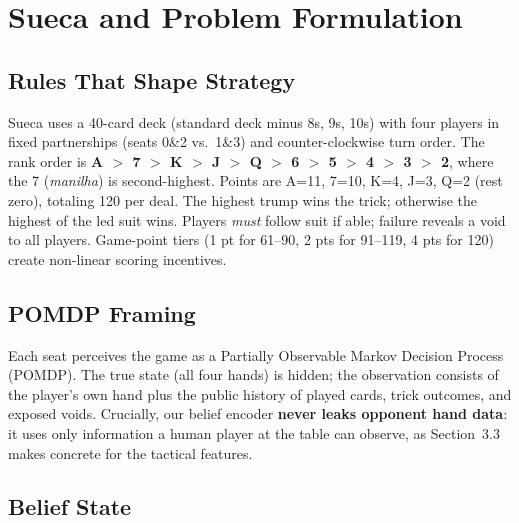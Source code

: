 \documentclass[runningheads]{llncs}
\begin{document}
\section{Sueca and Problem Formulation}

\subsection{Rules That Shape Strategy}

Sueca uses a 40-card deck (standard deck minus 8s, 9s, 10s) with four players
in fixed partnerships (seats 0\&2 vs.\ 1\&3) and counter-clockwise turn order.
The rank order is \textbf{A $>$ 7 $>$ K $>$ J $>$ Q $>$ 6 $>$ 5 $>$ 4 $>$ 3 $>$
2}, where the 7 (\emph{manilha}) is second-highest. Points are A=11, 7=10,
K=4, J=3, Q=2 (rest zero), totaling 120 per deal. The highest trump wins the
trick; otherwise the highest of the led suit wins. Players \emph{must} follow
suit if able; failure reveals a void to all players. Game-point tiers (1 pt for
61--90, 2 pts for 91--119, 4 pts for 120) create non-linear scoring incentives.

\subsection{POMDP Framing}

Each seat perceives the game as a Partially Observable Markov Decision Process
(POMDP). The true state (all four hands) is hidden; the observation consists of
the player's own hand plus the public history of played cards, trick outcomes,
and exposed voids. Crucially, our belief encoder \textbf{never leaks opponent
hand data}: it uses only information a human player at the table can observe, as
Section~3.3 makes concrete for the tactical features.

\subsection{Belief State}
\end{document}
